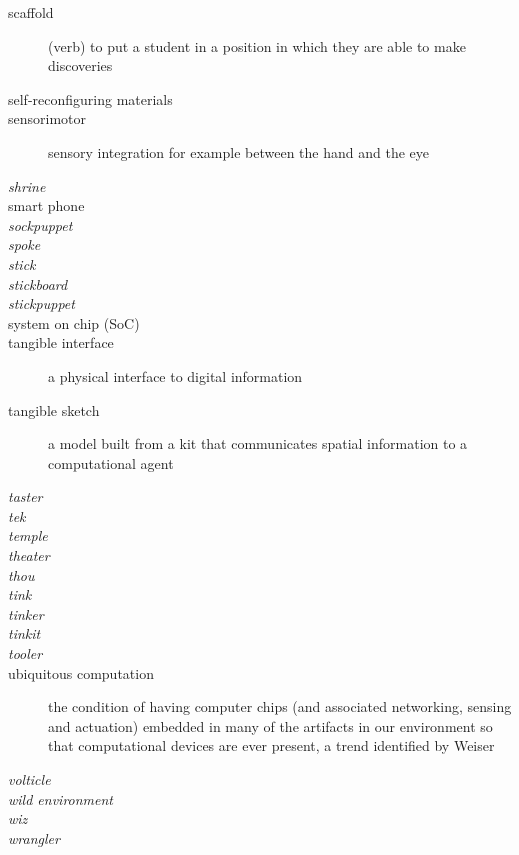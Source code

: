 \begin{description}
%
\item[scaffold] (verb) to put a student in a position in which they are able to make discoveries
%
\item[self-reconfiguring materials]
%
\item[sensorimotor] sensory integration for example between the hand and the eye
%
\item[\emph{shrine}]
%
\item[smart phone]
%
\item[\emph{sockpuppet}]
%
\item[\emph{spoke}]
%
\item[\emph{stick}]
%
\item[\emph{stickboard}]
%
\item[\emph{stickpuppet}]
%
\item[system on chip (SoC)]
%
\item[tangible interface] a physical interface to digital information
%
\item[tangible sketch] a model built from a kit that communicates spatial information to a computational agent
%
\item[\emph{taster}]
%
\item[\emph{tek}]
%
\item[\emph{temple}]
%
\item[\emph{theater}]
%
\item[\emph{thou}]
%
\item[\emph{tink}]
%
\item[\emph{tinker}]
%
\item[\emph{tinkit}]
%
\item[\emph{tooler}]
%
\item[ubiquitous computation] the condition of having computer chips (and associated networking, sensing and actuation) embedded in many of the artifacts in our environment so that computational devices are ever present, a trend identified by Weiser \citeyearpar{weiser_1999}
%
\item[\emph{volticle}]
%
\item[\emph{wild environment}]
%
\item[\emph{wiz}]
%
\item[\emph{wrangler}]
%
\end{description}

